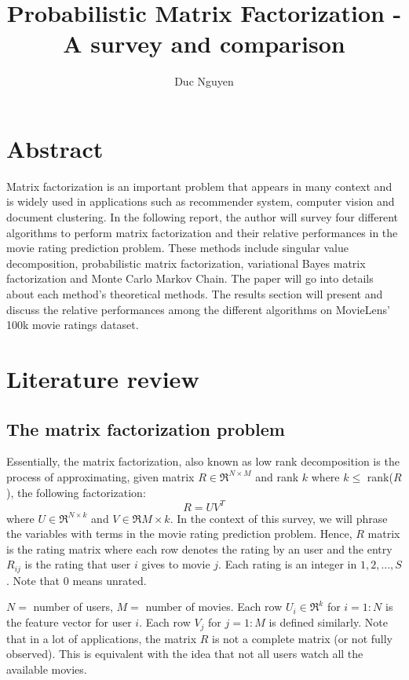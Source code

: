 \documentclass[journal,onecolumn]{IEEEtran}
\begin{document}
\title{Probabilistic Matrix Factorization - A survey and comparison}
\author{Duc Nguyen}
\maketitle

\section{Abstract}
Matrix factorization is an important problem that appears in many context and is widely used in applications such as recommender system, computer vision and document clustering. In the following report, the author will survey four different algorithms to perform matrix factorization and their relative performances in the movie rating prediction problem. These methods include singular value decomposition, probabilistic matrix factorization, variational Bayes matrix factorization and Monte Carlo Markov Chain. The paper will go into details about each method's theoretical methods. The results section will present and discuss the relative performances among the different algorithms on MovieLens' 100k movie ratings dataset.

\section{Literature review}

\subsection{The matrix factorization problem}
Essentially, the matrix factorization, also known as low rank decomposition is the process of approximating, given matrix $ R \in \Re^{N \times M}$ and rank $ k $ where $ k \leq $ rank($ R $), the following factorization:
\begin{equation}
R = UV^{T}
\end{equation}
where $ U \in \Re^{N \times k}$ and $ V \in \Re{M \times k} $. In the context of this survey, we will phrase the variables with terms in the movie rating prediction problem. Hence, $ R $ matrix is the rating matrix where each row denotes the rating by an user and the entry $ R_{ij} $ is the rating that user $ i $ gives to movie $ j $. Each rating is an integer in $ {1,2,..., S} $. Note that $ 0 $ means unrated.

$ N = $ number of users, $ M = $ number of movies. Each row $ U_i \in \Re^{k} $ for $ i = 1 : N $ is the feature vector for user $ i $. Each row $ V_j $ for $ j = 1 : M $ is defined similarly. Note that in a lot of applications, the matrix $ R $ is not a complete matrix (or not fully observed). This is equivalent with the idea that not all users watch all the available movies. 
\end{document}
